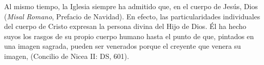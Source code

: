 	 Al mismo tiempo, la Iglesia siempre ha admitido que, en el cuerpo de Jesús, Dios  (\emph{Misal Romano}, Prefacio de Navidad). En efecto, las particularidades individuales del cuerpo de Cristo expresan la persona divina del Hijo de Dios. Él ha hecho suyos los rasgos de su propio cuerpo humano hasta el punto de que, pintados en una imagen sagrada, pueden ser venerados porque el creyente que venera su imagen,  (Concilio de Nicea II: DS, 601).